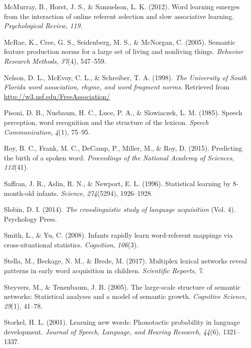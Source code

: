 \documentclass[english,floatsintext,man]{apa6}
\theoremstyle{definition}
\theoremstyle{definition}
\theoremstyle{definition}
\theoremstyle{remark}
\begin{document}
\hypertarget{ref-mcmurray2012}{}
McMurray, B., Horst, J. S., \& Samuelson, L. K. (2012). Word learning
emerges from the interaction of online referent selection and slow
associative learning. \emph{Psychological Review}, \emph{119}.

\hypertarget{ref-mcrae2005}{}
McRae, K., Cree, G. S., Seidenberg, M. S., \& McNorgan, C. (2005).
Semantic feature production norms for a large set of living and
nonliving things. \emph{Behavior Research Methods}, \emph{37}(4),
547--559.

\hypertarget{ref-nelson1998}{}
Nelson, D. L., McEvoy, C. L., \& Schreiber, T. A. (1998). \emph{The
University of South Florida word association, rhyme, and word fragment
norms}. Retrieved from \url{http://w3.usf.edu/FreeAssociation/}

\hypertarget{ref-pisoni1985}{}
Pisoni, D. B., Nusbaum, H. C., Luce, P. A., \& Slowiaczek, L. M. (1985).
Speech perception, word recognition and the structure of the lexicon.
\emph{Speech Communication}, \emph{4}(1), 75--95.

\hypertarget{ref-roy2015}{}
Roy, B. C., Frank, M. C., DeCamp, P., Miller, M., \& Roy, D. (2015).
Predicting the birth of a spoken word. \emph{Proceedings of the National
Academy of Sciences}, \emph{112}(41).

\hypertarget{ref-saffran1996}{}
Saffran, J. R., Aslin, R. N., \& Newport, E. L. (1996). Statistical
learning by 8-month-old infants. \emph{Science}, \emph{274}(5294),
1926--1928.

\hypertarget{ref-slobin2014}{}
Slobin, D. I. (2014). \emph{The crosslinguistic study of language
acquisition} (Vol. 4). Psychology Press.

\hypertarget{ref-smith2008}{}
Smith, L., \& Yu, C. (2008). Infants rapidly learn word-referent
mappings via cross-situational statistics. \emph{Cognition},
\emph{106}(3).

\hypertarget{ref-stella2017}{}
Stella, M., Beckage, N. M., \& Brede, M. (2017). Multiplex lexical
networks reveal patterns in early word acquisition in children.
\emph{Scientific Reports}, \emph{7}.

\hypertarget{ref-steyvers2005}{}
Steyvers, M., \& Tenenbaum, J. B. (2005). The large-scale structure of
semantic networks: Statistical analyses and a model of semantic growth.
\emph{Cognitive Science}, \emph{29}(1), 41--78.

\hypertarget{ref-storkel2001}{}
Storkel, H. L. (2001). Learning new words: Phonotactic probability in
language development. \emph{Journal of Speech, Language, and Hearing
Research}, \emph{44}(6), 1321--1337.
\end{document}
